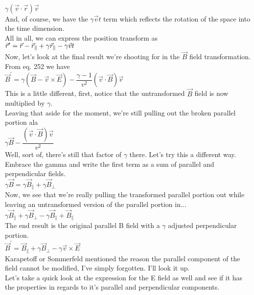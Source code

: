 \documentclass[prb,preprint]
{revtex4-1}
\begin{document}
\\
$\gamma \left(\vec{v} \cdot \vec{r}\right)\vec{v}$
\\
And, of course, we have the  $\gamma \vec{v} t$ term which reflects the rotation of the space into the time dimension.
\\
All in all, we can express the position transform as 
\\
$\vec{r}^\prime = \vec{r} - \vec{r}_\parallel + \gamma\vec{r}_\parallel -\gamma\vec{v}t
\\$
\\
Now, let's look at the final result we're shooting for in the $\vec{B}$ field transformation.  From eq. 252 we have
\\
$\vec{B}^\prime = \gamma \left(\vec{B} - \vec{v} \times \vec{E}\right) - \dfrac{\gamma - 1}{v^2}\left(\vec{v} \cdot \vec{B}\right)\vec{v}$
\\
This is a little different, first, notice that the untransformed $\vec{B}$ field is now multiplied by $\gamma$.
\\
Leaving that aside for the moment, we're still pulling out the broken parallel portion ala 
\\
$\gamma\vec{B} - \dfrac{\left(\vec{v} \cdot \vec{B}\right)\vec{v}}{v^2}$
\\
Well, sort of, there's still that factor of $\gamma$ there.  Let's try this a different way.  Embrace the gamma and write the first term as a sum of parallel and perpendicular fields.
\\
$\gamma\vec{B} = \gamma\vec{B}_\parallel + \gamma\vec{B}_\perp$
\\
Now, we see that we're really pulling the transformed parallel portion out while leaving an untransformed version of the parallel portion in...
\\
$\gamma\vec{B}_\parallel + \gamma\vec{B}_\perp - \gamma\vec{B}_\parallel + \vec{B}_\parallel$
\\
The end result is the original parallel B field with a $\gamma$ adjusted perpendicular portion.
\\
$\vec{B}^\prime = \vec{B}_\parallel + \gamma\vec{B}_\perp - \gamma \vec{v} \times \vec{E}$
\\
Karapetoff or Sommerfeld mentioned the reason the parallel component of the field cannot be modified, I've simply forgotten.  I'll look it up.
\\
Let's take a quick look at the expression for the E field as well and see if it has the properties in regards to it's parallel and perpendicular components.\\
\end{document}
